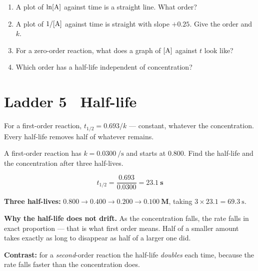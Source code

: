 \documentclass{apchem-worksheet}
\begin{document}
\begin{yourturn}
\begin{enumerate}[leftmargin=*,itemsep=0.5em]
  \item A plot of $\ln[\ce{A}]$ against time is a straight line. What
        order? \workspace[1.4cm]
  \item A plot of $1/[\ce{A}]$ against time is straight with slope
        $+0.25$. Give the order and $k$. \workspace[1.6cm]
  \item For a zero-order reaction, what does a graph of $[\ce{A}]$ against
        $t$ look like? \workspace[1.6cm]
  \item Which order has a half-life independent of concentration?
        \workspace[1.4cm]
\end{enumerate}
\end{yourturn}

\section*{\sffamily Ladder 5 \textbullet\ Half-life}

For a first-order reaction, $t_{1/2} = 0.693/k$ --- constant, whatever the
concentration. Every half-life removes half of whatever remains.

\begin{workedexample}
A first-order reaction has $k = \SI{0.0300}{\per\second}$ and starts at
\SI{0.800}{\Molar}. Find the half-life and the concentration after three
half-lives.

\[ t_{1/2} = \frac{0.693}{0.0300} = \mathbf{23.1~s} \]

\textbf{Three half-lives:}
$0.800 \to 0.400 \to 0.200 \to \mathbf{0.100~M}$, taking
$3 \times 23.1 = \SI{69.3}{\second}$.

\textbf{Why the half-life does not drift.} As the concentration falls, the
rate falls in exact proportion --- that is what first order means. Half of
a smaller amount takes exactly as long to disappear as half of a larger
one did.

\textbf{Contrast:} for a \emph{second}-order reaction the half-life
\emph{doubles} each time, because the rate falls faster than the
concentration does.
\end{workedexample}
\end{document}
